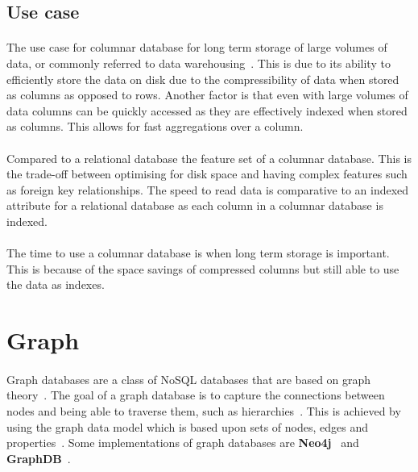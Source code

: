\documentclass{CRPITStyle}
\renewcommand{\cite}{\citep}
\begin{document}
\subsection{Use case}

\paragraph{}
The use case for columnar database for long term storage of large volumes of
data, or commonly referred to data warehousing~\cite{usingcolumn,bigtable}.
This is due to its ability to efficiently store the data on disk
due to the compressibility of data when stored as columns as opposed
to rows.
Another factor is that even with large volumes of data columns can
be quickly accessed as they are effectively indexed when stored as
columns.
This allows for fast aggregations over a column.

\paragraph{}
Compared to a relational database the feature set of a columnar database.
This is the trade-off between optimising for disk space and having
complex features such as foreign key relationships.
The speed to read data is comparative to an indexed attribute
for a relational database as each column in a columnar database is
indexed.

\paragraph{}
The time to use a columnar database is when long term storage is important.
This is because of the space savings of compressed columns but still able
to use the data as indexes.


\section{Graph}

\paragraph{}
Graph databases are a class of NoSQL databases that are based on graph
theory~\cite{nosql_survey,sql_nosql}.
The goal of a graph database is to capture the connections between
nodes and being able to traverse them,
such as hierarchies~\cite{type_nosql}.
This is achieved by using the graph data model which is based upon 
sets of nodes, edges and properties~\cite{nosql_survey,sql_nosql}.
Some implementations of graph databases are \textbf{Neo4j}~\cite{neo4j}
and \textbf{GraphDB}~\cite{graphdb}.
\end{document}
